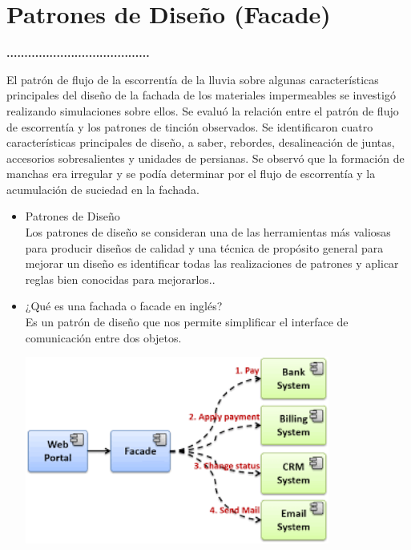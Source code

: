 \section{Patrones de Diseño (Facade)} 
\textbf{........................................}\\
\begin{flushleft}
El patrón de flujo de la escorrentía de la lluvia sobre algunas características principales del diseño de la fachada de los materiales impermeables se investigó realizando simulaciones sobre ellos. Se evaluó la relación entre el patrón de flujo de escorrentía y los patrones de tinción observados. Se identificaron cuatro características principales de diseño, a saber, rebordes, desalineación de juntas, accesorios sobresalientes y unidades de persianas. Se observó que la formación de manchas era irregular y se podía determinar por el flujo de escorrentía y la acumulación de suciedad en la fachada.

\begin{itemize}
	\item Patrones de Diseño
	\\Los patrones de diseño se consideran una de las herramientas más valiosas para producir diseños de calidad y una técnica de propósito general para mejorar un diseño es identificar todas las realizaciones de patrones y aplicar reglas bien conocidas para mejorarlos..


	


	\item ¿Qué es una fachada o facade en inglés?
	\\ Es un patrón de diseño que nos permite simplificar el interface de comunicación entre dos objetos.
	\begin{center}
	\includegraphics[width=10cm]{./images/1} 
	\end{center}


\end{itemize}
\end{flushleft}
